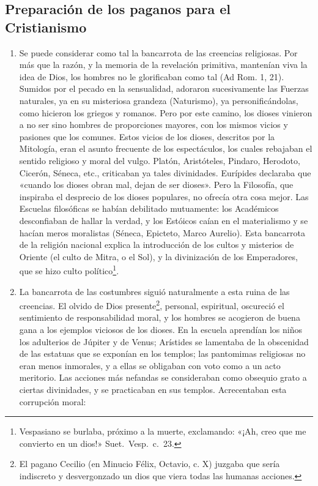 \raggedbottom{} \documentclass[12pt, a4paper, openany]{book} %
\begin{document}
\subsection{Preparación de los paganos para el Cristianismo}
\begin{enumerate}
  \item Se puede considerar como tal la bancarrota de las creencias religiosas. Por más que la razón, y la memoria de la revelación primitiva, mantenían viva la idea de Dios, los hombres no le glorificaban como tal (Ad Rom. 1, 21). Sumidos por el pecado en la sensualidad, adoraron sucesivamente las Fuerzas naturales, ya en su misteriosa grandeza (Naturismo), ya personificándolas, como hicieron los griegos y romanos. Pero por este camino, los dioses vinieron a no ser sino hombres de proporciones mayores, con los mismos vicios y pasiones que los comunes. Estos vicios de los dioses, descritos por la Mitología, eran el asunto frecuente de los espectáculos, los cuales rebajaban el sentido religioso y moral del vulgo. Platón, Aristóteles, Pindaro, Herodoto, Cicerón, Séneca, etc., criticaban ya tales divinidades. Eurípides declaraba que «cuando los dioses obran mal, dejan de ser dioses». Pero la Filosofía, que inspiraba el desprecio de los dioses populares, no ofrecía otra cosa mejor. Las Escuelas filosóficas se habían debilitado mutuamente: los Académicos desconfiaban de hallar la verdad, y los Estóicos caían en el materialismo y se hacían meros moralistas (Séneca, Epicteto, Marco Aurelio). Esta bancarrota de la religión nacional explica la introducción de los cultos y misterios de Oriente (el culto de Mitra, o el Sol), y la divinización de los Emperadores, que se hizo culto político\footnote{Vespasiano se burlaba, próximo a la muerte, exclamando: «¡Ah, creo que me convierto en un dios!» Suet.\ Vesp.\ c.\ 23.}.
  \item La bancarrota de las costumbres siguió naturalmente a esta ruina de las creencias. El olvido de Dios presente\footnote{El pagano Cecilio (en Minucio Félix, Octavio, c. X) juzgaba que sería indiscreto y desvergonzado un dios que viera todas las humanas acciones.}, personal, espiritual, oscureció el sentimiento de responsabilidad moral, y los hombres se acogieron de buena gana a los ejemplos viciosos de los dioses. En la escuela aprendían los niños los adulterios de Júpiter y de Venus; Arístides se lamentaba de la obscenidad de las estatuas que se exponían en los templos; las pantomimas religiosas no eran menos inmorales, y a ellas se obligaban con voto como a un acto meritorio. Las acciones más nefandas se consideraban como obsequio grato a ciertas divinidades, y se practicaban en sus templos. Acrecentaban esta corrupción moral: \begin{enumerate}

\end{enumerate}
\end{enumerate}
\end{document}

